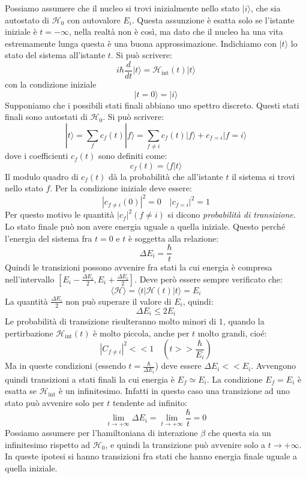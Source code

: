 Possiamo assumere che il nucleo si trovi inizialmente nello stato $|i\rangle$, che sia autostato di $\mathcal{H}_0$ con autovalore $E_i$. Questa assunzione è esatta solo se l'istante iniziale
è $t=-\infty$, nella realtà non è così, ma dato che il nucleo ha una vita estremamente lunga questa è una buona approssimazione. Indichiamo con $|t\rangle$ lo stato del sistema
all'istante $t$. Si può scrivere:
\[
i\hbar\frac{d}{dt}|t\rangle=\mathcal{H}_{\text{int}}(t)|t\rangle
\]
con la condizione iniziale
\[
|t=0\rangle=|i\rangle
\]
Supponiamo  che i possibili stati finali abbiano uno spettro discreto. Questi stati finali sono autostati di $\mathcal{H}_0$. Si può scrivere:
\[
|t\rangle=\sum_fc_f(t)|f\rangle=\sum_{f\neq i}c_f(t)|f\rangle+c_{f= i}|f=i\rangle
\]
dove i coefficienti $c_f(t)$ sono definiti come:
\[
c_f(t)=\langle f|t\rangle
\]
Il modulo quadro di $c_f(t)$ dà la probabilità che all'istante $t$ il sistema si trovi nello stato $f$. Per la condizione iniziale deve essere:
\[
|c_{f\neq i}(0)|^2=0\quad |c_{f=i}|^2=1
\]
Per questo motivo le quantità $|c_f|^2(f\neq i)$ si dicono \textit{probabilità di transizione}. Lo stato finale può non avere energia uguale a quella iniziale.
Questo perché l'energia del sistema fra $t=0$ e $t$ è soggetta alla relazione:
\[
\Delta E_i=\frac{\hbar}{t}
\]
Quindi le transizioni possono avvenire fra stati la cui energia è compresa nell'intervallo $[E_i-\frac{\Delta E_i}{2},E_i+\frac{\Delta E_i}{2}]$.
Deve però essere sempre verificato che:
\[
\langle\mathcal{H}\rangle=\langle t|\mathcal{H}(t)|t\rangle=E_i
\]
La quantità $\frac{\Delta E_i}{2}$ non può superare il valore di $E_i$, quindi:
\[
\Delta E_i\leq2E_i
\]
Le probabilità di transizione risulteranno molto minori di $1$, quando la pertirbazione $\mathcal{H}_{\text{int}}(t)$ è molto piccola, anche per $t$ molto grandi, cioé:
\[
|C_{f\neq i}|^2<<1\quad(t>>\frac{\hbar}{E_i})
\]
Ma in queste condizioni (essendo $t=\frac{\hbar}{\Delta E_i}$) deve essere $\Delta E_i<<E_i$. Avvengono quindi transizioni a stati finali la cui energia è $E_f\simeq E_i$.
La condizione $E_f=E_i$ è esatta se $\mathcal{H}_{\text{int}}$ è un infinitesimo. Infatti in questo caso una transizione  ad uno stato può avvenire solo per $t$ tendente ad infinito:
\[
\lim_{t\rightarrow+\infty}\Delta E_i=\lim_{t\rightarrow+\infty}\frac{\hbar}{t}=0
\]
Possiamo assumere per l'hamiltoniana di interazione $\beta$ che questa sia un infinitesimo rispetto ad $\mathcal{H}_0$, e quindi la transizione può avvenire solo a $t\rightarrow+\infty$.
In queste ipotesi si hanno transizioni fra stati che hanno energia finale uguale a quella iniziale.


